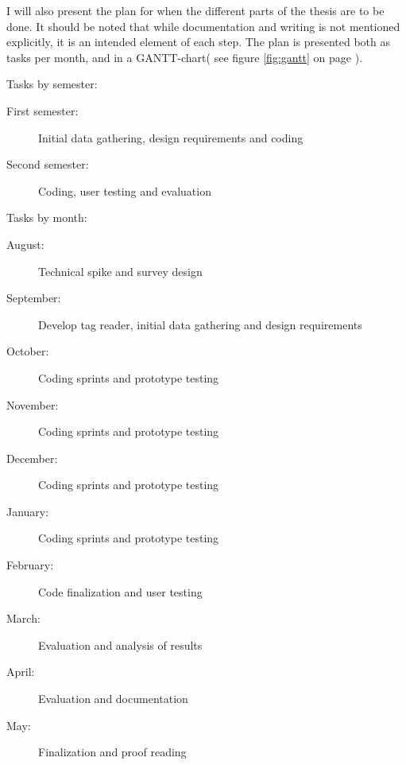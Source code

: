 I will also present the plan for when the different parts of the thesis are to be done. 
It should be noted that while documentation and writing is not mentioned explicitly, it is an intended element of each step.
The plan is presented both as tasks per month, and in a GANTT-chart( see figure \ref{fig:gantt} on page \pageref{fig:gantt}). 

Tasks by semester:
\begin{description}
    \item[First semester: ] Initial data gathering, design requirements and coding
    \item[Second semester: ] Coding, user testing and evaluation
\end{description}

Tasks by month:
\begin{description}
    \item[August: ] Technical spike and survey design
    \item[September: ] Develop tag reader, initial data gathering and design requirements
    \item[October: ] Coding sprints and prototype testing
    \item[November: ] Coding sprints and prototype testing
    \item[December: ] Coding sprints and prototype testing
    \item[January: ] Coding sprints and prototype testing
    \item[February: ] Code finalization and user testing
    \item[March: ]  Evaluation and analysis of results
    \item[April: ] Evaluation and documentation
    \item[May: ] Finalization and proof reading
\end{description}


